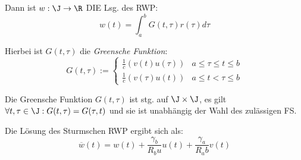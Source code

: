 Dann ist \(w : \J \to \R\) DIE Lsg. des RWP: \[w(t)=\int_a^b G(t,\tau)r(\tau) d\tau\]

Hierbei ist \(G(t,\tau)\) die \emph{Greensche Funktion}:
\[G(t,\tau) := \begin{cases}
	\frac{1}{c}(v(t)u(\tau)) & a \leq \tau \leq t \leq b \\
	\frac{1}{c}(v(\tau)u(t)) & a \leq t < \tau \leq b
\end{cases}\]

Die Greensche Funktion \(G(t,\tau)\) ist stg. auf \(\J \times \J\), es gilt \(\forall t, \tau \in \J : G(t,\tau)=G(\tau,t)\) und sie ist unabhängig der Wahl des zulässigen FS.

Die Lösung des Sturmschen RWP ergibt sich als: \[\overline w(t) = w(t) + \frac{\gamma_b}{R_b u} u(t) + \frac{\gamma_a}{R_a b} v(t)\]
